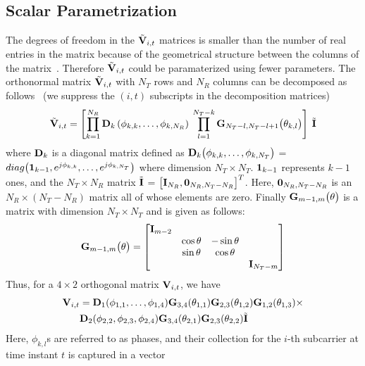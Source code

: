 \documentclass[journal,10pt,twocolumn]{IEEEtran}
\def\bD{{\bf D}}
\def\bG{{\bf G}}
\def\bI{{\bf I}}
\def\bV{{\bf V}}
\begin{document}
\subsection{Scalar Parametrization}
\label{givens}
The degrees of freedom in the $\tilde{\bV}_{i,t}$ matrices is smaller
than the number of real entries in the matrix because of the
geometrical structure between the columns of the
matrix~\cite{4114278}.  Therefore $\tilde{\bV}_{i,t}$ could be paramaterized
using fewer parameters.
The orthonormal matrix $\tilde{\bV}_{i,t}$ with
$N_T$ rows and $N_R$ columns can be decomposed as
follows~\cite{4114278} (we suppress the $(i, t)$ subscripts in the
decomposition matrices)
\begin{equation}
\label{eq:decompose}
\tilde{\bV}_{i,t} = \left[\prod_{k=1}^{N_{R}} \bD_{k} \left( \phi_{k,k},\ldots , \phi_{k,N_{R}} \right) \:  \prod_{l=1}^{N_{T}-k} \bG_{N_{T}-l,N_{T} -l+1} \big( \theta_{k,l}\big)  \right] \: \tilde{\bI}
\end{equation}
where $\bD_{k}$ is a diagonal matrix defined as
$\bD_{k}\big(\phi_{k,k}, \ldots, \phi_{k,N_T } \big)$ =
$\mbox{diag}\big( {\bf 1}_{k-1}, e^{j\phi_{k,k}},\ldots,
e^{j\phi_{k,N_T }} \big)$ where  dimension $N_T \times N_T$. ${\bf 1}_{k-1}$ represents $k-1$ ones,
and the $N_T \times N_R$ matrix $\tilde{\bI}$ =
$\big[\bI_{N_R }, {\bf 0}_{N_R ,N_T -N_R}\big]^{T}$. Here,
${\bf 0}_{N_R ,N_T -N_R }$ is an $N_R\times (N_T - N_R)$ matrix all of
whose elements are zero. Finally $\bG_{m-1,m}\big(\theta\big)$ is a matrix with dimension $N_T \times N_T$ and is given as follows:
\begin{equation}
\bG_{m-1,m}\big(\theta\big)  =
\begin{bmatrix}
\bI_{m-2} & & & \\
& \cos\theta & -\sin\theta & \\
& \sin\theta & \cos\theta & \\
& & & \bI_{N_T -m}
\end{bmatrix}
\end{equation}
Thus, for a $4 \times 2$ orthogonal matrix $\bV_{i,t}$, we have
\begin{align*}
  \bV_{i,t} & =
  \bD_{1}(\phi_{1,1},\ldots,\phi_{1,4})\bG_{3,4}(\theta_{1,1})
  \bG_{2,3}(\theta_{1,2}) \bG_{1,2}(\theta_{1,3})\times\\
& \bD_{2}(\phi_{2,2},\phi_{2,3},\phi_{2,4}) \bG_{3,4}(\theta_{2,1}) \bG_{2,3}(\theta_{2,2})\tilde{\bI}
\end{align*}
Here, $\phi_{k,l}$s are referred to as phases, and their collection for
the $i$-th subcarrier at time instant $t$ is captured in a vector
\end{document}
